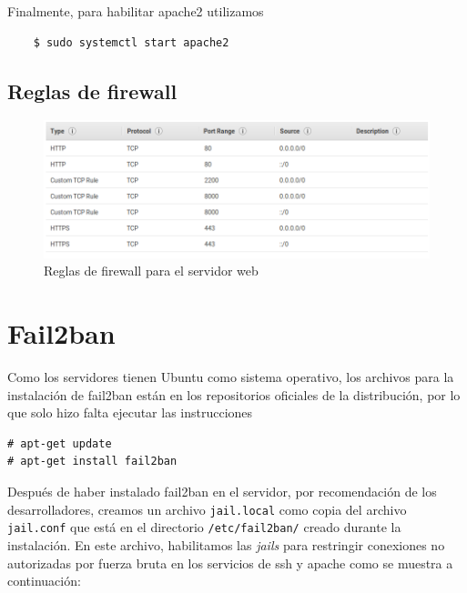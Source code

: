 \documentclass[9pt]{article}
\begin{document}
Finalmente, para habilitar \textsf{apache2} utilizamos
\begin{verbatim}
    $ sudo systemctl start apache2
\end{verbatim}

\subsection{Reglas de firewall}
\begin{figure}[H]
  \centering
  \includegraphics[width=\textwidth]{lamesec}
  \caption{Reglas de \textsf{firewall} para el servidor web}
\end{figure}

\section{Fail2ban}
Como los servidores tienen \textsf{Ubuntu} como sistema operativo, los archivos para la instalación de \textsf{fail2ban} están en los repositorios oficiales de la distribución, por lo que solo hizo falta ejecutar las instrucciones
\begin{verbatim}
# apt-get update
# apt-get install fail2ban
\end{verbatim}
Después de haber instalado \textsf{fail2ban} en el servidor, por recomendación de los desarrolladores, creamos un archivo \texttt{jail.local} como copia del archivo \texttt{jail.conf} que está en el directorio \texttt{/etc/fail2ban/} creado durante la instalación. En este archivo, habilitamos las \textit{jails} para restringir conexiones no autorizadas por fuerza bruta en los servicios de \textsf{ssh} y \textsf{apache} como se muestra a continuación:
\end{document}
